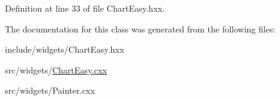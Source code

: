 Definition at line 33 of file Chart\+Easy.\+hxx.



The documentation for this class was generated from the following files\+:\begin{DoxyCompactItemize}
\item 
include/widgets/Chart\+Easy.\+hxx\item 
src/widgets/\mbox{\hyperlink{_chart_easy_8cxx}{Chart\+Easy.\+cxx}}\item 
src/widgets/Painter.\+cxx\end{DoxyCompactItemize}
